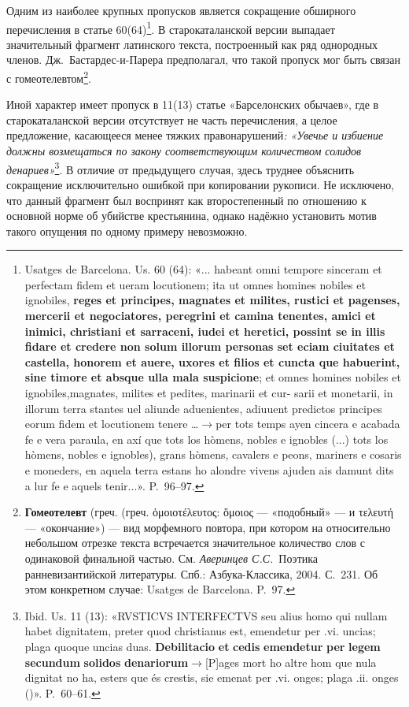 Одним из наиболее крупных пропусков является сокращение обширного перечисления в статье 60(64)\footnote{Usatges de Barcelona. Us. 60 (64): «... habeant omni tempore sinceram et perfectam fidem et ueram locutionem; ita ut omnes homines nobiles et ignobiles,\textbf{ reges et principes, magnates et milites, rustici et pagenses, mercerii et negociatores, peregrini et camina tenentes, amici et inimici, christiani et sarraceni, iudei et heretici, possint se in illis fidare et credere non solum illorum personas set eciam ciuitates et castella, honorem et auere, uxores et filios et cuncta que habuerint, sine timore et absque ulla mala suspicione}; et omnes homines nobiles et ignobiles,magnates, milites et pedites, marinarii et cur- sarii et monetarii, in illorum terra stantes uel aliunde aduenientes, adiuuent predictos principes eorum fidem et locutionem tenere …$\rightarrow$per tots temps ayen cincera e acabada fe e vera paraula, en axí que tots los hòmens, nobles e ignobles (...) tots los hòmens, nobles e ignobles), grans hòmens, cavalers e peons, mariners e cosaris e moneders, en aquela terra estans ho alondre vivens ajuden ais damunt dits a lur fe e aquels tenir...». P.~96--97.}. В старокаталанской версии выпадает значительный фрагмент латинского текста, построенный как ряд однородных членов. Дж.~Бастардес-и-Парера предполагал, что такой пропуск мог быть связан с гомеотелевтом\footnote{\textbf{Гомеотелевт }(греч. (греч. {\unicodefallback ὁ}μοιοτέλευτος: {\unicodefallback ὅ}μοιος --- «подобный» --- и τελευτή --- «окончание») --- вид морфемного повтора, при котором на относительно небольшом отрезке текста встречается значительное количество слов с одинаковой финальной частью. См. \emph{Аверинцев С.С.}~Поэтика ранневизантийской литературы. Спб.: Азбука-Классика, 2004. С.~231. Об этом конкретном случае: Usatges de Barcelona. P.~97.}.

Иной характер имеет пропуск в 11(13) статье «Барселонских обычаев», где в старокаталанской версии отсутствует не часть перечисления, а целое предложение, касающееся менее тяжких правонарушений\emph{: }\emph{«}\emph{Увечье и избиение должны возмещаться по закону соответствующим количеством солидов денариев}\emph{»}\footnote{Ibid. Us. 11 (13): «RVSTICVS INTERFECTVS seu alius homo qui nullam habet dignitatem, preter quod christianus est, emendetur per .vi. uncias; plaga quoque uncias duas. \textbf{Debilitacio}\textbf{ }\textbf{et}\textbf{ }\textbf{cedis}\textbf{ }\textbf{emendetur}\textbf{ }\textbf{per}\textbf{ }\textbf{legem}\textbf{ }\textbf{secundum}\textbf{ }\textbf{solidos}\textbf{ }\textbf{denariorum}$\rightarrow$[P]ages mort ho altre hom que nula dignitat no ha, esters que és crestis, sie emenat per .vi. onges; plaga .ii. onges ()». P.~60--61.}. В отличие от предыдущего случая, здесь труднее объяснить сокращение исключительно ошибкой при копировании рукописи. Не исключено, что данный фрагмент был воспринят как второстепенный по отношению к основной норме об убийстве крестьянина, однако надёжно установить мотив такого опущения по одному примеру невозможно.\emph{ }

